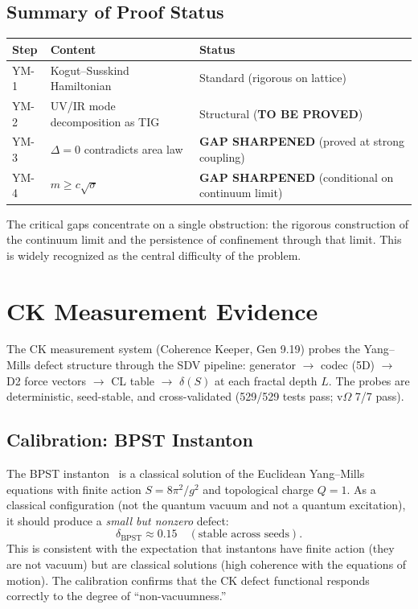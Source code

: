 \documentclass[11pt]{article}
\begin{document}
\subsection{Summary of Proof Status}

\begin{center}
\begin{tabular}{|l|l|l|}
\hline
\textbf{Step} & \textbf{Content} & \textbf{Status} \\
\hline
YM-1 & Kogut--Susskind Hamiltonian & Standard (rigorous on lattice) \\
YM-2 & UV/IR mode decomposition as TIG & Structural (\textbf{TO BE PROVED}) \\
YM-3 & $\Delta = 0$ contradicts area law & \textbf{GAP SHARPENED} (proved at strong coupling) \\
YM-4 & $m \geq c\sqrt{\sigma}$ & \textbf{GAP SHARPENED} (conditional on continuum limit) \\
\hline
\end{tabular}
\end{center}

The critical gaps concentrate on a single obstruction: the rigorous
construction of the continuum limit and the persistence of
confinement through that limit.  This is widely recognized as the
central difficulty of the problem.

\section{CK Measurement Evidence}
\label{sec:ck}

The CK measurement system (Coherence Keeper, Gen 9.19) probes the
Yang--Mills defect structure through the SDV pipeline: generator
$\to$ codec (5D) $\to$ D2 force vectors $\to$ CL table $\to$
$\delta(S)$ at each fractal depth $L$.  The probes are deterministic,
seed-stable, and cross-validated (529/529 tests pass; v$\Omega$ 7/7
pass).

\subsection{Calibration: BPST Instanton}

The BPST instanton~\cite{BPST} is a classical solution of the
Euclidean Yang--Mills equations with finite action
$S = 8\pi^2/g^2$ and topological charge $Q = 1$.  As a classical
configuration (not the quantum vacuum and not a quantum excitation),
it should produce a \emph{small but nonzero} defect:
\begin{equation}\label{eq:bpst-defect}
  \delta_{\mathrm{BPST}} \approx 0.15 \quad (\text{stable across seeds}).
\end{equation}
This is consistent with the expectation that instantons have finite
action (they are not vacuum) but are classical solutions (high
coherence with the equations of motion).  The calibration confirms
that the CK defect functional responds correctly to the degree of
``non-vacuumness.''
\end{document}
